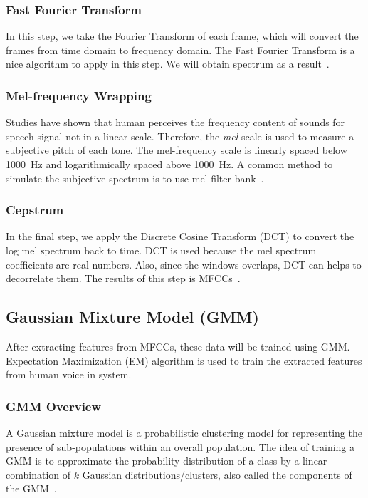 \documentclass[a4paper,12pt]{article}
\begin{document}
\subsubsection{Fast Fourier Transform}
In this step, we take the Fourier Transform of each frame, which will convert
the frames from time domain to frequency domain.  The Fast Fourier Transform
is a nice algorithm to apply in this step.  We will obtain spectrum
as a result~\cite{do}.

\subsubsection{Mel-frequency Wrapping}
Studies have shown that human perceives the frequency content of sounds for
speech signal not in a linear scale.  Therefore, the \emph{mel} scale is used to
measure a subjective pitch of each tone.  The mel-frequency scale is linearly
spaced below \SI{1000}{\hertz} and logarithmically spaced above
\SI{1000}{\hertz}.  A common method to simulate the subjective spectrum
is to use mel filter bank~\cite{do}.

\subsubsection{Cepstrum}
In the final step, we apply the Discrete Cosine Transform (DCT) to convert the
log mel spectrum back to time.  DCT is used because the mel spectrum
coefficients are real numbers.  Also, since the windows overlaps, DCT can helps
to decorrelate them.  The results of this step is MFCCs~\cite{do}.

\subsection{Gaussian Mixture Model (GMM)}
After extracting features from MFCCs, these data will be trained using GMM.
Expectation Maximization (EM) algorithm is used to train the extracted features
from human voice in system.

\subsubsection{GMM Overview}
A Gaussian mixture model is a probabilistic clustering model for representing
the presence of sub-populations within an overall population.  The idea of
training a GMM is to approximate the probability distribution of a class by a
linear combination of $k$ Gaussian distributions/clusters, also called the
components of the GMM~\cite{gmm}.
\end{document}

